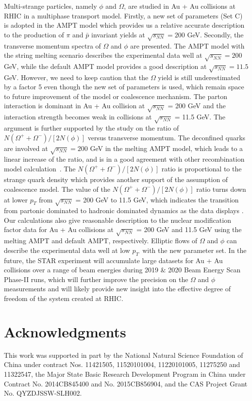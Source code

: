 \documentclass[twocolumn,aps,prc,showpacs,superscriptaddress,preprintnumbers,floatfix,nofootinbib]{revtex4}
\newcommand{ \pt } {${p_{T}}$}
\begin{document}
\begin{CJK*}{GBK}{song}
Multi-strange particles, namely $\phi$ and $\Omega$, are studied in Au + Au collisions at RHIC in a multiphase transport model. Firstly, a new set of parameters (Set C) is adopted in the AMPT model which provides us a relative accurate description to the production of  $\pi$ and $\bar{p}$ invariant yields  at $\sqrt{s_{NN}} = 200$ GeV.  Secondly, the transverse momentum spectra of $\Omega$ and $\phi$ are presented. The AMPT model with the string melting scenario describes the experimental data well at $\sqrt{s_{NN}} = 200$ GeV, while the default AMPT model provides a good description at $\sqrt{s_{NN}} = 11.5$ GeV. However, we need to keep caution that the $\Omega$ yield is still underestimated by a factor 5 even though the  new set of parameters is  used, which remain space to future improvement of the model or coalescence mechanism. The parton interaction is dominant in Au + Au collision at $\sqrt{s_{NN}}$ = 200 GeV and the interaction strength becomes weak in collisions at $\sqrt{s_{NN}}$ = 11.5 GeV. The argument is further supported by the study on the ratio of $N(\Omega ^++\Omega^-)/[2N(\phi)]$ versus transverse momentum. The deconfined quarks are involved at $\sqrt{s_{NN}} = 200$ GeV in the melting AMPT model, which leads to a linear increase of the ratio, and is in a good agreement with other recombination model calculation~\cite{ratio}. The $N(\Omega ^++\Omega^-)/[2N(\phi)]$ ratio is proportional to the strange quark density which provides another support of the assumption of coalescence model. The value of the $N(\Omega ^++\Omega^-)/[2N(\phi)]$ ratio turns down at lower $p_T$ from $\sqrt{s_{NN}}$ =  200 GeV to 11.5 GeV, which indicates the transition from partonic dominated to hadronic dominated dynamics as the data displays \cite{OmegaphiSTAR}.
 Our calculations also give reasonable description to the nuclear modification factor data for Au + Au collisions at $\sqrt{s_{NN}}$ = 200 GeV and 11.5 GeV using the melting AMPT and default AMPT, respectively.
Elliptic flows of $\Omega$ and $\phi$ can describe the experimental data well at low \pt~with the new parameter set. In the future, the STAR experiment will accumulate large datasets for Au + Au collisions over a range of beam energies during 2019 $\&$ 2020 Beam Energy Scan Phase-II runs, which will further improve the precision on the $\Omega$ and $\phi$ measurements and will likely provide new insight into the effective degree of freedom of the system created at RHIC.

\section*{Acknowledgments}
This work was supported in part by the National Natural Science Foundation of China under contract Nos. 11421505, 11520101004, 11220101005, 11275250 and 11322547,  the Major State Basic Research Development Program in China under Contract No. 2014CB845400 and No. 2015CB856904, and the CAS Project Grant No. QYZDJSSW-SLH002.



\end{CJK*}
\end{document}

